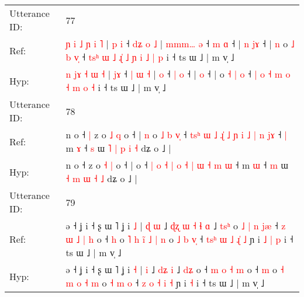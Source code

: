 \documentclass[10pt]{article}
\DeclareRobustCommand{\hl}[1]{{\textcolor{red}{#1}}}
\begin{document}
\begin{longtable}{ll}
 \\
\midrule
Utterance ID: & 77 \\
Ref: & \hl{ɲ} \hl{i}\hl{ }\hl{˩} \hl{ɲ} \hl{i} \hl{˥} | \hl{p}\hl{ }\hl{i} ˧ \hl{d}\hl{ʑ} \hl{o} \hl{˩} |\hl{ }\hl{m}\hl{m}\hl{m}\hl{…} \hl{ə} ˧ \hl{m} \hl{ɑ} ˧ |\hl{ }\hl{n} \hl{j}\hl{ɤ} ˧ |\hl{ }\hl{n} o \hl{˩} \hl{b} \hl{v}\hl{̩} ˧\hl{ }\hl{t}\hl{s}\hl{ʰ} \hl{ɯ} \hl{˩} \hl{ɻ}\hl{̍} \hl{˩} \hl{ɲ} \hl{i} \hl{˩} \hl{|} \hl{p} i ˧ ts ɯ ˩ | m v̩ ˩
 \\
Hyp: & \hl{n} \hl{}\hl{j}\hl{ɤ} \hl{˧} \hl{ɯ} \hl{˧} | \hl{}\hl{j}\hl{ɤ} ˧ \hl{}\hl{|} \hl{ɯ} \hl{˧} |\hl{}\hl{}\hl{}\hl{}\hl{} \hl{o} ˧ \hl{|} \hl{o} ˧ |\hl{}\hl{} \hl{}\hl{o} ˧ |\hl{}\hl{} o \hl{˧} \hl{|} \hl{}\hl{o} ˧\hl{}\hl{}\hl{}\hl{} \hl{|} \hl{o} \hl{}\hl{˧} \hl{m} \hl{o} \hl{˧} \hl{m} \hl{o} \hl{˧} i ˧ ts ɯ ˩ | m v̩ ˩
 \\
\midrule
Utterance ID: & 78 \\
Ref: & n o ˧\hl{ }\hl{|} z o \hl{˩} \hl{q} o ˧ |\hl{ }\hl{n} o\hl{ }\hl{˩}\hl{ }\hl{b}\hl{ }\hl{v}\hl{̩} ˧ \hl{t}\hl{s}\hl{ʰ} \hl{ɯ} \hl{˩} \hl{ɻ}\hl{̍} \hl{˩} \hl{ɲ} \hl{i} \hl{˩} \hl{|} \hl{n} \hl{j}\hl{ɤ} ˧\hl{ }\hl{|} m \hl{ɤ} ˧ \hl{s} ɯ \hl{˥} \hl{|} \hl{p} \hl{i} \hl{˧} dʑ o ˩ |
 \\
Hyp: & n o ˧\hl{}\hl{} z o \hl{˧} \hl{|} o ˧ |\hl{}\hl{} o\hl{}\hl{}\hl{}\hl{}\hl{}\hl{}\hl{} ˧ \hl{}\hl{}\hl{|} \hl{o} \hl{˧} \hl{}\hl{|} \hl{o} \hl{˧} \hl{|} \hl{ɯ} \hl{˧} \hl{m} \hl{}\hl{ɯ} ˧\hl{}\hl{} m \hl{ɯ} ˧ \hl{m} ɯ \hl{˧} \hl{m} \hl{ɯ} \hl{˧} \hl{˩} dʑ o ˩ |
 \\
\midrule
Utterance ID: & 79 \\
Ref: & ə ˧ ʝ i ˧ ʂ ɯ ˥ ʝ i \hl{˩} |\hl{ }\hl{ɖ} \hl{ɯ} ˩\hl{ }\hl{ɖ}\hl{ʐ}\hl{ }\hl{ɯ} \hl{˧}\hl{ }\hl{ɬ} \hl{ɑ} ˩ \hl{t}\hl{s}\hl{ʰ} o\hl{ }\hl{˩}\hl{ }\hl{|}\hl{ }\hl{n}\hl{ }\hl{j}\hl{æ} ˧\hl{ }\hl{z} \hl{ɯ} \hl{˩} \hl{|} \hl{h} o ˧ \hl{h} o\hl{ }\hl{˥} \hl{h} \hl{i}\hl{̃} \hl{˩} \hl{|} \hl{n} o \hl{˩} \hl{b} \hl{v}\hl{̩} ˧ \hl{t}\hl{s}\hl{ʰ} \hl{ɯ} \hl{˩} \hl{ɻ}\hl{̍} \hl{˩} ɲ i\hl{ }\hl{˩}\hl{ }\hl{|} \hl{p} i ˧ ts ɯ ˩ | m v̩ ˩
 \\
Hyp: & ə ˧ ʝ i ˧ ʂ ɯ ˥ ʝ i \hl{˧} |\hl{}\hl{} \hl{i} ˩\hl{}\hl{}\hl{}\hl{}\hl{} \hl{}\hl{d}\hl{ʑ} \hl{i} ˩ \hl{}\hl{d}\hl{ʑ} o\hl{}\hl{}\hl{}\hl{}\hl{}\hl{}\hl{}\hl{}\hl{} ˧\hl{}\hl{} \hl{m} \hl{o} \hl{˧} \hl{m} o ˧ \hl{m} o\hl{}\hl{} \hl{˧} \hl{}\hl{m} \hl{o} \hl{˧} \hl{m} o \hl{˧} \hl{m} \hl{}\hl{o} ˧ \hl{}\hl{}\hl{z} \hl{o} \hl{˧} \hl{}\hl{i} \hl{˧} ɲ i\hl{}\hl{}\hl{}\hl{} \hl{˧} i ˧ ts ɯ ˩ | m v̩ ˩
 \\
\midrule

\end{longtable}
\end{document}
